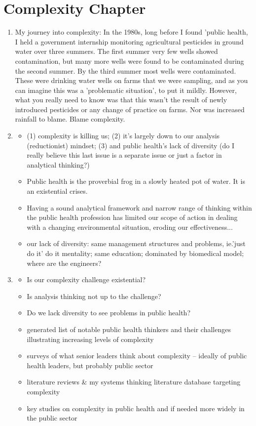 \section*{Complexity Chapter}
\begin{enumerate}
	\item {} My journey into complexity: In the 1980s, long before I found 'public health, I held a government internship monitoring agricultural pesticides in ground water over three summers. The first summer very few wells showed contamination, but many more wells were found to be contaminated during the second summer. By the third summer most wells were contaminated. These were drinking water wells on farms that we were sampling, and as you can imagine this was a 'problematic situation', to put it mildly. However, what you really need to know was that this wasn't the result of newly introduced pesticides or any change of practice on farms. Nor was increased rainfall to blame. Blame complexity.
	\item {} 
	\begin{itemize}
		\item (1) complexity is killing us; (2) it's largely down to our analysis (reductionist) mindset; (3) and public health's lack of diversity (do I really believe this last issue is a separate issue or just a factor in analytical thinking?)
		\item Public health is the proverbial frog in a slowly heated pot of water. It is an existential crises.
		\item Having a sound analytical framework and narrow range of thinking within the public health profession has limited our scope of action in dealing with a changing environmental situation, eroding our effectiveness...
		\item our lack of diversity: same management structures and problems, ie.'just do it' do it mentality; same education; dominated by biomedical model; where are the engineers?
	\end{itemize}

	\item {}
	\begin{itemize}
		\item Is our complexity challenge existential?
		\item Is analysis thinking not up to the challenge?
		\item Do we lack diversity to see problems in public health?
		\item generated list of notable public health thinkers and their challenges illustrating increasing levels of complexity
		\item surveys of what senior leaders think about complexity -- ideally of public health leaders, but probably public sector
		\item literature reviews \& my systems thinking literature database targeting complexity
		\item key studies on complexity in public health and if needed more widely in the public sector
	\end{itemize}
	

\end{enumerate}
